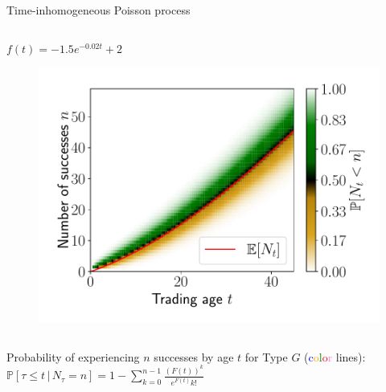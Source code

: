 \documentclass{beamer}
\begin{document}
\begin{frame}[allowframebreaks]{Time-inhomogeneous Poisson process}
\begin{columns}[t]
		\begin{column}{0.49\textwidth}
			\begin{block}{$f(t)=-1.5e^{-0.02t}+2$}
				\begin{figure}
					\includegraphics[width=\linewidth]{figures/probn1}
				\end{figure}
			\end{block}  
		\end{column}
	\end{columns}

\framebreak

Probability of experiencing $n$ successes by age $t$ for Type $G$
(\textcolor{blue}{c}\textcolor{orange}{o}\textcolor{green}{l}\textcolor{red}{o}\textcolor{violet}{r} lines):
$
\mathbb{P}[\tau \leq t \,|\, N_{\tau} = n]
= 1 - \sum_{k=0}^{n-1} \frac{\left(F(t)\right)^k}{e^{F(t)}k!}
$


\end{frame}
\end{document}
